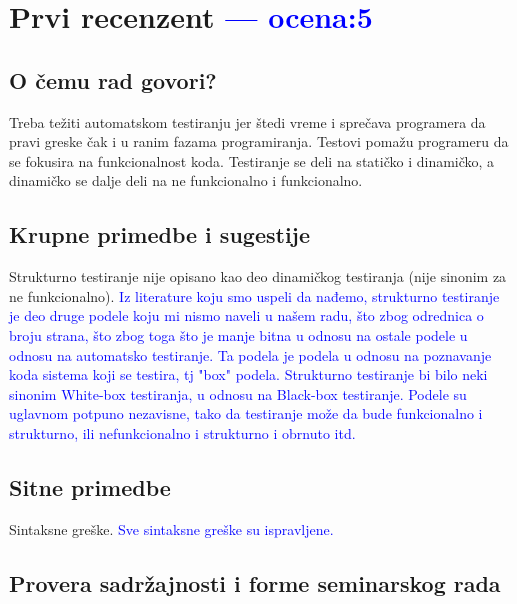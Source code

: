 \documentclass[a4paper]{report}
\newcommand{\odgovor}[1]{\textcolor{blue}{#1}}
\begin{document}
\chapter{Prvi recenzent \odgovor{--- ocena:5} }
\section{O čemu rad govori?}
Treba težiti automatskom testiranju jer štedi vreme i sprečava programera da pravi greske čak i u ranim fazama programiranja. Testovi pomažu programeru da se fokusira na funkcionalnost koda. Testiranje se deli na statičko i dinamičko, a dinamičko se dalje deli na ne funkcionalno i funkcionalno.

\section{Krupne primedbe i sugestije}
Strukturno testiranje nije opisano kao deo dinamičkog testiranja (nije sinonim za ne funkcionalno).
\odgovor{Iz literature koju smo uspeli da nađemo, strukturno testiranje je deo druge podele koju mi nismo naveli u našem radu, što zbog odrednica o broju strana, što zbog toga što je manje bitna u odnosu na ostale podele u odnosu na automatsko testiranje. Ta podela je podela u odnosu na poznavanje koda sistema koji se testira, tj "box" podela. Strukturno testiranje bi bilo neki sinonim White-box testiranja, u odnosu na Black-box testiranje. Podele su uglavnom potpuno nezavisne, tako da testiranje može da bude funkcionalno i strukturno, ili nefunkcionalno i strukturno i obrnuto itd.}
\section{Sitne primedbe}
Sintaksne greške.
\odgovor{Sve sintaksne greške su ispravljene.}

\section{Provera sadržajnosti i forme seminarskog rada}
\end{document}
